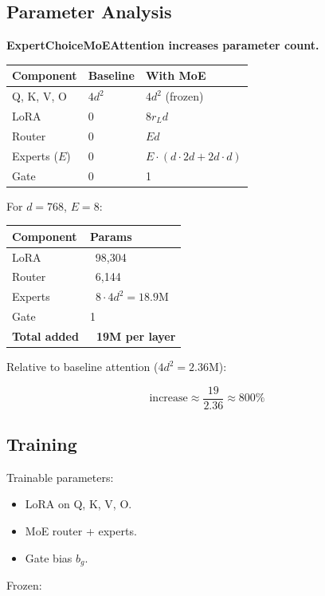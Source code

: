 \subsection{Parameter Analysis}

\textbf{ExpertChoiceMoEAttention increases parameter count.}

\begin{table}[H]
\centering
\small
\begin{tabular}{lll}
\toprule
\textbf{Component} & \textbf{Baseline} & \textbf{With MoE} \\
\midrule
Q, K, V, O & $4 d^2$ & $4 d^2$ (frozen) \\
LoRA & 0 & $8 r_L d$ \\
Router & 0 & $E d$ \\
Experts ($E$) & 0 & $E \cdot (d \cdot 2d + 2d \cdot d)$ \\
Gate & 0 & 1 \\
\bottomrule
\end{tabular}
\end{table}

For $d = 768$, $E = 8$:

\begin{table}[H]
\centering
\small
\begin{tabular}{ll}
\toprule
\textbf{Component} & \textbf{Params} \\
\midrule
LoRA & ~98,304 \\
Router & ~6,144 \\
Experts & ~$8 \cdot 4 d^2 = 18.9$M \\
Gate & 1 \\
\textbf{Total added} & \textbf{~19M per layer} \\
\bottomrule
\end{tabular}
\end{table}

Relative to baseline attention ($4 d^2 = 2.36$M):

\[
\text{increase} \approx \frac{19}{2.36} \approx 800\%
\tag{4.15}
\]

\subsection{Training}

Trainable parameters:

\begin{itemize}
\item LoRA on Q, K, V, O.
\item MoE router + experts.
\item Gate bias $b_g$.

\end{itemize}
Frozen:

